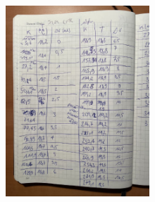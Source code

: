 \begin{figure}[H]
    \includegraphics[width=0.48\textwidth]{figures/labjournal/lfk4.jpg} 
\end{figure}
